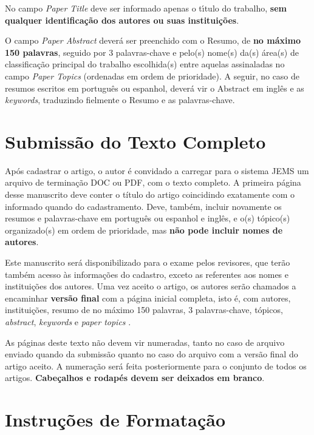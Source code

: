 \documentclass[a4paper,11pt]{article}
\begin{document}
No campo \textit{Paper Title} deve ser informado apenas o t\'\i tulo do trabalho,
\textbf{ sem qualquer identifica\-\c c\~ao dos autores ou suas institui\c c\~oes}.

O campo \textit{Paper Abstract} dever\'a ser preenchido com o Resumo, de \textbf{no m\'aximo 150 palavras},
seguido por 3 palavras-chave e pelo(s) nome(s) da(s) \'area(s) de classifica\c c\~ao principal do trabalho escolhida(s) 
entre aquelas assinaladas no campo \textit{ Paper Topics} (ordenadas em ordem de prioridade). 
A seguir, no caso de resumos escritos em portugu\^es ou espanhol, dever\'a vir o Abstract em ingl\^es
e as \textit{keywords}, traduzindo fielmente o Resumo e as palavras-chave. 


\section{Submiss\~ao do Texto Completo}

Ap\'os cadastrar o artigo, o autor \'e convidado a carregar para o sistema JEMS um arquivo 
de termina\-\c c\~ao DOC ou PDF, com o texto completo. 
A primeira p\'agina desse manuscrito deve conter o t\'itulo do artigo coincidindo exatamente com o informado quando do cadastramento. 
Deve, tamb\'em, incluir novamente os resumos e palavras-chave em portugu\^es ou espanhol e ingl\^es, e o(s) t\'opico(s) organizado(s) 
em ordem de prioridade, mas \textbf{n\~ao pode incluir nomes de autores}.

Este manuscrito ser\'a disponibilizado para o exame pelos revisores, que ter\~ao tamb\'em acesso
 \`as informa\c c\~oes do cadastro, exceto as referentes aos nomes e institui\c c\~oes dos autores. 
Uma vez aceito o artigo, os autores ser\~ao chamados a encaminhar \textbf{vers\~ao final} com a p\'agina inicial completa, isto \'e, com autores, institui\c c\~oes, resumo de no m\'aximo 150 palavras, 3 palavras-chave, t\'opicos, \textit{abstract}, \textit{keywords} e \textit{paper topics} .

As p\'aginas deste texto n\~ao devem vir numeradas, tanto no caso de arquivo enviado quando da submiss\~ao quanto no caso do arquivo com a vers\~ao final do artigo aceito. 
A numera\c c\~ao ser\'a feita posteriormente para o conjunto de todos os artigos.
\textbf{Cabe\c calhos e rodap\'es devem ser deixados em branco}.


\section{ Instru\c c\~oes de Formata\c c\~ao}
\end{document}
